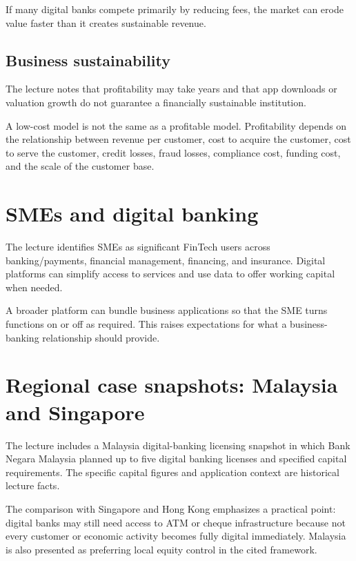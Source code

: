 If many digital banks compete primarily by reducing fees, the market can erode value faster than it creates sustainable revenue.

\subsection{Business sustainability}

The lecture notes that profitability may take years and that app downloads or valuation growth do not guarantee a financially sustainable institution.

\begin{pitfall}
A low-cost model is not the same as a profitable model. Profitability depends on the relationship between revenue per customer, cost to acquire the customer, cost to serve the customer, credit losses, fraud losses, compliance cost, funding cost, and the scale of the customer base.
\end{pitfall}

\section{SMEs and digital banking}

The lecture identifies SMEs as significant FinTech users across banking/payments, financial management, financing, and insurance. Digital platforms can simplify access to services and use data to offer working capital when needed.

A broader platform can bundle business applications so that the SME turns functions on or off as required. This raises expectations for what a business-banking relationship should provide.

\section{Regional case snapshots: Malaysia and Singapore}

The lecture includes a Malaysia digital-banking licensing snapshot in which Bank Negara Malaysia planned up to five digital banking licenses and specified capital requirements. The specific capital figures and application context are historical lecture facts.

The comparison with Singapore and Hong Kong emphasizes a practical point: digital banks may still need access to ATM or cheque infrastructure because not every customer or economic activity becomes fully digital immediately. Malaysia is also presented as preferring local equity control in the cited framework.

